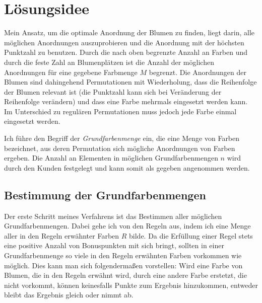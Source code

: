 \documentclass[a4paper,10pt,ngerman]{scrartcl}
\title{\Aufgabe}
\author{\Name\\Team-ID: \Einsendenummer}
\date{\today}
\begin{document}
\maketitle
\tableofcontents

\section{Lösungsidee}
\label{sec:idea}
Mein Ansatz, um die optimale Anordnung der Blumen zu finden, liegt darin, alle möglichen Anordnungen auszuprobieren und die Anordnung mit der höchsten Punktzahl zu benutzen.
Durch die nach oben begrenzte Anzahl an Farben und durch die feste Zahl an Blumenplätzen ist die Anzahl der möglichen Anordnungen für eine gegebene Farbmenge $M$ begrenzt.
Die Anordnungen der Blumen sind dahingehend Permutationen mit Wiederholung, dass die Reihenfolge der Blumen relevant ist (die Punktzahl kann sich bei Veränderung der Reihenfolge verändern) und dass eine Farbe mehrmals eingesetzt werden kann.
Im Unterschied zu regulären Permutationen muss jedoch jede Farbe einmal eingesetzt werden.

Ich führe den Begriff der \textit{Grundfarbenmenge} ein, die eine Menge von Farben bezeichnet, aus deren Permutation sich mögliche Anordnungen von Farben ergeben.
Die Anzahl an Elementen in möglichen Grundfarbenmengen $n$ wird durch den Kunden festgelegt und kann somit als gegeben angenommen werden.

\subsection{Bestimmung der Grundfarbenmengen}
Der erste Schritt meines Verfahrens ist das Bestimmen aller möglichen Grundfarbenmengen.
Dabei gehe ich von den Regeln aus, indem ich eine Menge aller in den Regeln erwähnter Farben $R$ bilde.
Da die Erfüllung einer Regel stets eine positive Anzahl von Bonuspunkten mit sich bringt, sollten in einer Grundfarbenmenge so viele in den Regeln erwähnten Farben vorkommen wie möglich.
Dies kann man sich folgendermaßen vorstellen: Wird eine Farbe von Blumen, die in den Regeln erwähnt wird, durch eine andere Farbe erstetzt, die nicht vorkommt, können keinesfalls Punkte zum Ergebnis hinzukommen, entweder bleibt das Ergebnis gleich oder nimmt ab.
\end{document}
